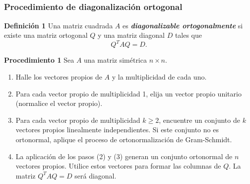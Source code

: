 
\subsection{}

{\nologo 
\begin{frame}\frametitle{Procedimiento de diagonalización ortogonal}
	
	\vspace{0mm}
	\begin{defi}{\textbf{Definición 1}}\justifying
		\justifying
		Una matriz cuadrada $A$ es \textbf{\textit{diagonalizable ortogonalmente}} si existe una matriz 
		ortogonal $Q$ y una matriz diagonal $D$ tales que
		\[
		Q^TAQ = D.
		\]
	\end{defi}	
	
	\vspace{-1mm}
	\begin{ejem}{\textbf{Procedimiento 1}}\justifying
		\justifying
		Sea $A$ una matriz simétrica $n\times n$. 
		\begin{enumerate}\justifying
			\item Halle los vectores propios de $A$ y la multiplicidad de cada uno.
			\item Para cada vector propio de multiplicidad 1, elija un vector propio unitario (normalice el vector propio).
			\item Para cada vector propio de multiplicidad $k\geq 2$, encuentre un conjunto 
			de $k$ vectores propios linealmente independientes. Si este conjunto no es ortonormal,
			aplique el proceso de ortonormalización de Gram-Schmidt.			
			\item La aplicación de los pasos (2) y (3) generan un conjunto ortonormal de $n$ vectores propios.
			Utilice estos vectores para formar las columnas de $Q$. La matriz $Q^TAQ=D$ será diagonal.
		\end{enumerate}
	\end{ejem}		
	
\end{frame}
}


\subsection{}

